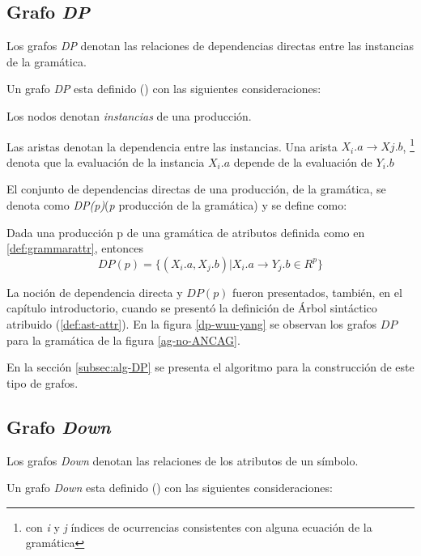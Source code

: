 \subsection{Grafo \textit{DP}}
\label{subsec:graph-dp-def}
Los grafos \textit{DP} denotan las relaciones de dependencias directas entre las instancias de la gramática. 

Un grafo \textit{DP} esta definido (\cite{estruc-algorit}) con las siguientes consideraciones: 

\begin{items}
\item Los nodos denotan \textit{instancias} de una producción.
\item Las aristas denotan la dependencia entre las instancias. Una arista $X_{i}.a\rightarrow X{j}.b$, \footnote{con \textit{i} y \textit{j} índices de ocurrencias consistentes con alguna ecuación de la gramática} denota que la evaluación de la instancia \textit{$X_{i}.a$} depende de la evaluación de \textit{$Y_{i}.b$} 
\end{items}

El conjunto de dependencias directas de una producción, de la gramática, se denota como \textit{DP(p)}(\textit{p} producción de la gramática) y se define como:
\begin{definition}
Dada una producción p de una gramática de atributos definida como en \ref{def:grammarattr}, entonces
\begin{equation}
DP(p) = \{(X_{i}.a, X_{j}.b) | X_{i}.a \rightarrow Y_{j}.b \in R^{p} \}
\end{equation}
\end{definition}

La noción de dependencia directa y $DP(p)$ fueron presentados, también, en el capítulo introductorio, cuando se presentó la definición de Árbol sintáctico atribuido (\ref{def:ast-attr}).  
En la figura \ref{dp-wuu-yang} se observan los grafos $DP$ para la gramática de la figura \ref{ag-no-ANCAG}.

En la sección \ref{subsec:alg-DP} se presenta el algoritmo para la construcción de este tipo de grafos.

\subsection{Grafo \textit{Down}}
\label{subsec:graph-down-def}
Los grafos \textit{Down} denotan las relaciones de los atributos de un símbolo. 

Un grafo \textit{Down} esta definido (\cite{estruc-algorit}) con las siguientes consideraciones: 

